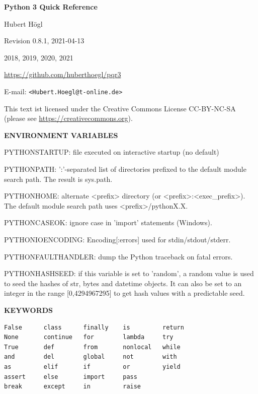 \documentclass[9pt,a4wide]{extarticle}
\begin{document}
\begin{center}
{\LARGE\bf
     Python 3 Quick Reference\\
}
           \bigskip

           Hubert Högl

      Revision 0.8.1, 2021-04-13 
      
        2018, 2019, 2020, 2021

 \url{https://github.com/huberthoegl/pqr3}
      
\end{center}

\vskip 1cm

\newcommand{\rval}{$\rightarrow$\ }

\setlength{\columnsep}{2cm}
\begin{multicols}{2}
  \tableofcontents
\end{multicols}

\vfill

E-mail: {\tt <Hubert.Hoegl@t-online.de>}

This text ist licensed under the Creative Commons License CC-BY-NC-SA (please
see \url{https://creativecommons.org}).

\newpage

{\LARGE\bf ENVIRONMENT VARIABLES}
{}

PYTHONSTARTUP: file executed on interactive startup (no default)

PYTHONPATH: ':'-separated list of directories prefixed to the
 default module search path.  The result is sys.path.

PYTHONHOME: alternate <prefix> directory (or <prefix>:<exec\_prefix>).
 The default module search path uses <prefix>/pythonX.X.

PYTHONCASEOK: ignore case in 'import' statements (Windows).

PYTHONIOENCODING: Encoding[:errors] used for stdin/stdout/stderr.

PYTHONFAULTHANDLER: dump the Python traceback on fatal errors.

PYTHONHASHSEED: if this variable is set to
'random', a random value is used to seed the
hashes of str, bytes and datetime objects.  It
can also be set to an integer in the range
[0,4294967295] to get hash values with a
predictable seed.


\bigskip
{\LARGE\bf KEYWORDS}
{}

\begin{verbatim}
False      class      finally    is         return
None       continue   for        lambda     try
True       def        from       nonlocal   while
and        del        global     not        with
as         elif       if         or         yield
assert     else       import     pass
break      except     in         raise
\end{verbatim}
\end{document}
